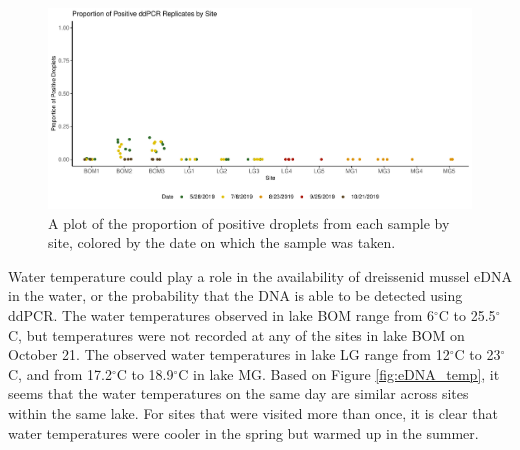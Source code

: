 \documentclass[12pt]{article}\usepackage[]{graphicx}\usepackage[]{color}
\makeatletter
\def\maxwidth{ %
  \ifdim\Gin@nat@width>\linewidth
    \linewidth
  \else
    \Gin@nat@width
  \fi
}
\newenvironment{knitrout}{}{} %
\def\maxwidth{ %
  \ifdim\Gin@nat@width>\linewidth
    \linewidth
  \else
    \Gin@nat@width
  \fi
}
\newenvironment{knitrout}{}{} %
\makeatother
\begin{document}
\begin{figure}[]
\begin{knitrout}
\color{fgcolor}

{\centering \includegraphics[width=\maxwidth]{figure/eDNA_visualization_droplets-1} 

}



\end{knitrout}
\caption{A plot of the proportion of positive droplets from each sample by site, colored by the date on which the sample was taken.}
\label{fig:eDNA_droplets}
\end{figure}

Water temperature could play a role in the availability of dreissenid mussel eDNA in the water, or the probability that the DNA is able to be detected using ddPCR. The water temperatures observed in lake BOM range from 6$^\circ$C to 25.5$^\circ$C, but temperatures were not recorded at any of the sites in lake BOM on October 21. The observed water temperatures in lake LG range from 12$^\circ$C to 23$^\circ$C, and from 17.2$^\circ$C to 18.9$^\circ$C in lake MG. Based on Figure \ref{fig:eDNA_temp}, it seems that the water temperatures on the same day are similar across sites within the same lake. For sites that were visited more than once, it is clear that water temperatures were cooler in the spring but warmed up in the summer. 
\end{document}
